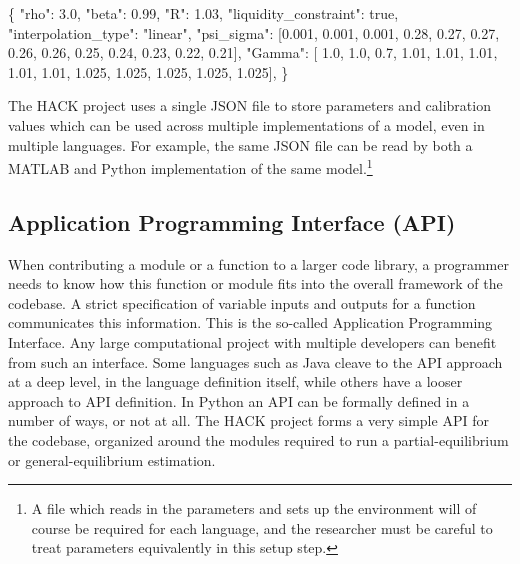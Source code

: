 \documentclass[]{article}
\newenvironment{Shaded}{}{}
\newcommand{\DataTypeTok}[1]{\textcolor[rgb]{0.56,0.13,0.00}{{#1}}}
\newcommand{\DecValTok}[1]{\textcolor[rgb]{0.25,0.63,0.44}{{#1}}}
\newcommand{\FloatTok}[1]{\textcolor[rgb]{0.25,0.63,0.44}{{#1}}}
\newcommand{\StringTok}[1]{\textcolor[rgb]{0.25,0.44,0.63}{{#1}}}
\newcommand{\NormalTok}[1]{{#1}}
\begin{document}
\begin{Shaded}
\begin{Highlighting}[]
\NormalTok{\{}
\DataTypeTok{"rho"}\NormalTok{:   }\FloatTok{3.0}\NormalTok{,}
\DataTypeTok{"beta"}\NormalTok{:  }\FloatTok{0.99}\NormalTok{,}
\DataTypeTok{"R"}\NormalTok{:     }\FloatTok{1.03}\NormalTok{,}
\DataTypeTok{"liquidity_constraint"}\NormalTok{: }\DecValTok{true}\NormalTok{,}
\DataTypeTok{"interpolation_type"}\NormalTok{: }\StringTok{"linear"}\NormalTok{,}
\DataTypeTok{"psi_sigma"}\NormalTok{: [}\FloatTok{0.001}\NormalTok{, }\FloatTok{0.001}\NormalTok{, }\FloatTok{0.001}\NormalTok{,}
    \FloatTok{0.28}\NormalTok{, }\FloatTok{0.27}\NormalTok{, }\FloatTok{0.27}\NormalTok{, }\FloatTok{0.26}\NormalTok{, }\FloatTok{0.26}\NormalTok{,}
    \FloatTok{0.25}\NormalTok{, }\FloatTok{0.24}\NormalTok{, }\FloatTok{0.23}\NormalTok{, }\FloatTok{0.22}\NormalTok{, }\FloatTok{0.21}\NormalTok{],}
\DataTypeTok{"Gamma"}\NormalTok{:  [ }\FloatTok{1.0}\NormalTok{,   }\FloatTok{1.0}\NormalTok{,   }\FloatTok{0.7}\NormalTok{,}
\FloatTok{1.01}\NormalTok{,  }\FloatTok{1.01}\NormalTok{,  }\FloatTok{1.01}\NormalTok{,  }\FloatTok{1.01}\NormalTok{,  }\FloatTok{1.01}\NormalTok{,}
\FloatTok{1.025}\NormalTok{, }\FloatTok{1.025}\NormalTok{, }\FloatTok{1.025}\NormalTok{, }\FloatTok{1.025}\NormalTok{, }\FloatTok{1.025}\NormalTok{],}
\NormalTok{\}}
\end{Highlighting}
\end{Shaded}

The HACK project uses a single JSON file to store parameters and
calibration values which can be used across multiple implementations of
a model, even in multiple languages. For example, the same JSON file can
be read by both a MATLAB and Python implementation of the same
model.\footnote{A file which reads in the parameters and sets up the
  environment will of course be required for each language, and the
  researcher must be careful to treat parameters equivalently in this
  setup step.}

\subsection{Application Programming Interface
(API)}\label{application-programming-interface-api}

When contributing a module or a function to a larger code library, a
programmer needs to know how this function or module fits into the
overall framework of the codebase. A strict specification of variable
inputs and outputs for a function communicates this information. This is
the so-called Application Programming Interface. Any large computational
project with multiple developers can benefit from such an interface.
Some languages such as Java cleave to the API approach at a deep level,
in the language definition itself, while others have a looser approach
to API definition. In Python an API can be formally defined in a number
of ways, or not at all. The HACK project forms a very simple API for the
codebase, organized around the modules required to run a
partial-equilibrium or general-equilibrium estimation.
\end{document}
